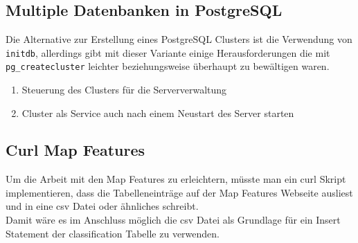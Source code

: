 \part{\appendixname}
\appendix
{} \chead{} \ohead{\headmark}
\ifoot{\printTitle}  \ofoot{}

\newpage
\setheadsepline{.5px}
\setfootsepline{.5px}
\chapter{Multiple Datenbanken in PostgreSQL}\label{ch:clustering}
Die Alternative zur Erstellung eines PostgreSQL Clusters\cite{postgresql-cluster} ist die Verwendung von \lstinline[language=bash]|initdb|\cite{postgresql-cluster}, allerdings gibt mit dieser Variante einige Herausforderungen die mit \lstinline[language=bash]|pg_createcluster| leichter beziehungsweise überhaupt zu bewältigen waren.
\begin{enumerate}
	\item Steuerung des Clusters\cite{postgresql-cluster} für die Serververwaltung
	\item Cluster als Service auch nach einem Neustart des Server starten
\end{enumerate}

\chapter{Curl Map Features}\label{ap:ch:curl-mapfeatures}
Um die Arbeit mit den Map Features\cite{osm-mapfeatures} zu erleichtern, müsste man ein curl Skript implementieren, dass die Tabelleneinträge auf der Map Features\cite{osm-mapfeatures} Webseite ausliest und in eine csv Datei oder ähnliches schreibt.\\

Damit wäre es im Anschluss möglich die csv Datei als Grundlage für ein Insert Statement der classification Tabelle zu verwenden.
